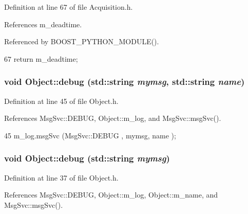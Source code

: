 Definition at line 67 of file Acquisition.h.

References m\_\-deadtime.

Referenced by BOOST\_\-PYTHON\_\-MODULE().


\begin{DoxyCode}
67 {return m_deadtime;}
\end{DoxyCode}
\hypertarget{classObject_a6c9a0397ca804e04d675ed05683f5420}{
\subsubsection[{debug}]{\setlength{\rightskip}{0pt plus 5cm}void Object::debug (std::string {\em mymsg}, \/  std::string {\em name})}}
\label{classObject_a6c9a0397ca804e04d675ed05683f5420}


Definition at line 45 of file Object.h.

References MsgSvc::DEBUG, Object::m\_\-log, and MsgSvc::msgSvc().


\begin{DoxyCode}
45 { m_log.msgSvc (MsgSvc::DEBUG   , mymsg, name ); }
\end{DoxyCode}
\hypertarget{classObject_aac010553f022165573714b7014a15f0d}{
\subsubsection[{debug}]{\setlength{\rightskip}{0pt plus 5cm}void Object::debug (std::string {\em mymsg})}}
\label{classObject_aac010553f022165573714b7014a15f0d}


Definition at line 37 of file Object.h.

References MsgSvc::DEBUG, Object::m\_\-log, Object::m\_\-name, and MsgSvc::msgSvc().

